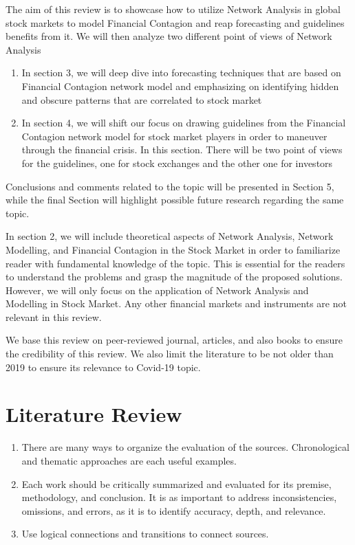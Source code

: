 \documentclass[a4paper,11pt]{article}
\begin{document}
The aim of this review is to showcase how to utilize Network Analysis in global stock markets to model Financial Contagion and reap forecasting and guidelines benefits from it. 
We will then analyze two different point of views of Network Analysis
\begin{enumerate}
        \item In section 3, we will deep dive into forecasting techniques that are based on Financial Contagion network model and emphasizing on identifying hidden and obscure patterns that are correlated to stock market
        \item In section 4, we will shift our focus on drawing guidelines from the Financial Contagion network model for stock market players in order to maneuver through the financial crisis. In this section. There will be two point of views for the guidelines, one for stock exchanges and the other one for investors
\end{enumerate}
Conclusions and comments related to the topic will be presented in Section 5, while the final Section will highlight possible future research regarding the same topic.  

In section 2, we will include theoretical aspects of Network Analysis, Network Modelling, and Financial Contagion in the Stock Market in order to familiarize reader with fundamental knowledge of the topic.
This is essential for the readers to understand the problems and grasp the magnitude of the proposed solutions.
However, we will only focus on the application of Network Analysis and Modelling in Stock Market. 
Any other financial markets and instruments are not relevant in this review.

We base this review on peer-reviewed journal, articles, and also books to ensure the credibility of this review. 
We also limit the literature to be not older than 2019 to ensure its relevance to Covid-19 topic.

\section{Literature Review}

\begin{enumerate}
    \item There are many ways to organize the evaluation of the sources. Chronological and thematic approaches are each useful examples.
    \item Each work should be critically summarized and evaluated for its premise, methodology, and conclusion. It is as important to address inconsistencies, omissions, and errors, as it is to identify accuracy, depth, and relevance.
    \item Use logical connections and transitions to connect sources.
\end{enumerate}
\end{document}

